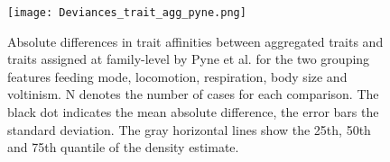 \documentclass[../Draft_harmonization_paper.tex]{subfiles}
\begin{document}
\begin{figure}[H]
  \centering
  \texttt{[image: Deviances\_trait\_agg\_pyne.png]}
  \caption{Absolute differences in trait affinities between aggregated traits and traits assigned at family-level by Pyne et al. for the two grouping features feeding mode, locomotion, respiration, body size and voltinism. N denotes the number of cases for each comparison. The black dot indicates the mean absolute difference, the error bars the standard deviation. The gray horizontal lines show the 25th, 50th and 75th quantile of the density estimate.}
  \label{fig:diff_aggr_traits_pyne}
\end{figure}

\end{document}
